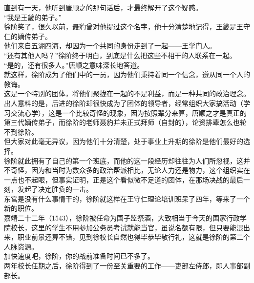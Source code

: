 \begin{multicols}{\theparacolNo}
直到有一天，他听到唐顺之的那句话后，才最终解开了这个疑惑。\\

“我是王畿的弟子。”\\

徐阶笑了，很久以前，聂豹曾对他提过这个名字，他十分清楚地记得，王畿是王守仁的嫡传弟子。\\

他们来自五湖四海，却因为一个共同的身份走到了一起——王学门人。\\

“还有其他人吗？”徐阶终于明白，到底是什么把这些不相干的人联系在一起。\\

“是的，还有很多人。”唐顺之意味深长地答道。\\

就这样，徐阶成为了他们中的一员，因为他们秉持着同一个信念，遵从同一个人的教诲。\\

这是一个特别的团体，将他们聚拢在一起的不是利益，而是一种共同的政治理念。\\

出人意料的是，后进的徐阶却很快成为了团体的领导者，经常组织大家搞活动（学习交流心学），这是一个比较奇怪的现象，因为按照辈分来算，唐顺之才是真正的第三代嫡传弟子，而徐阶的老师聂豹并未正式拜师（自封的），论资排辈怎么也轮不到徐阶。\\

但大家对此毫无异议，因为他们十分清楚，处于事业上升期的徐阶是他们最好的选择。\\

徐阶就此拥有了自己的第一个班底，而他的这一段经历却往往为人们所忽视，这并不奇怪，因为和当时为数众多的政治帮派相比，无论人力还是物力，这个组织实在一点也不起眼，但事实证明，正是这个看似微不足道的团体，在那场决战的最后一刻，发起了决定胜负的一击。\\

东宫是没有什么事情干的，徐阶就这样在王守仁理论培训班呆了四年，等来了一个新的职位。\\

嘉靖二十二年（1543），徐阶被任命为国子监祭酒，大致相当于今天的国家行政学院校长，这里的学生不用参加公务员考试就能当官，虽说名额有限，但只要能混出来，职业前景还算不错，见到徐校长自然也得毕恭毕敬行礼，这就是徐阶的第二个人脉资源。\\

加快速度吧，徐阶，你的战前准备时间已不多了。\\

两年校长任期之后，徐阶得到了一份至关重要的工作——吏部左侍郎，即人事部副部长。\\


\end{multicols}
